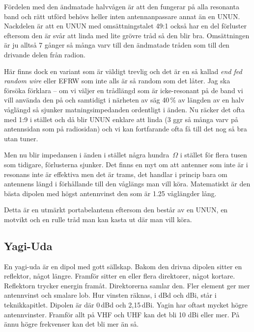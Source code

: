 Fördelen med den ändmatade halvvågen är att den fungerar på alla
resonanta band och rätt utförd behövs heller inten antennanpassare
annat än en UNUN. Nackdelen är att en UNUN med omsättningstalet 49:1
också har en del förluster eftersom den är svår att linda med lite
grövre tråd så den blir bra. Omsättningen är ju alltså 7 gånger så
många varv till den ändmatade tråden som till den drivande delen från
radion.

Här finns dock en variant som är väldigt trevlig och det är en så
kallad {\it end fed random wire} eller EFRW som inte alls är så random
som det låter. Jag ska försöka förklara -- om vi väljer en trådlängd
som är icke-resonant på de band vi vill använda den på och samtidigt i
närheten av säg 40\,\% av längden av en halv våglängd så sjunker
matningsimpedanden ordentligt i änden. Nu räcker det ofta med 1:9 i
stället och då blir UNUN enklare att linda (3 ggr så många varv på
antennsidan som på radiosidan) och vi kan fortfarande ofta få till det
nog så bra utan tuner.

Men nu blir impedansen i änden i stället några hundra~$\Omega$ i stället
för flera tusen som tidigare, förlusterna sjunker. Det finns en myt om
att antenner som inte är i resonans inte är effektiva men det är
trams, det handlar i princip bara om antennens längd i förhållande
till den våglängs man vill köra. Matematiskt är den bästa dipolen med
högst antennvinst den som är 1.25 våglängder lång.

Detta är en utmärkt portabelantenn eftersom den består av en UNUN, en
motvikt och en rulle tråd man kan kasta ut där man vill köra.

\subsection{Yagi-Uda}

En yagi-uda är en dipol med gott sällskap. Bakom den drivna dipolen
sitter en reflektor, något längre. Framför sitter en eller flera
direktorer, något kortare. Reflektorn trycker energin
framåt. Direktorerna samlar den.  Fler element ger mer antennvinst och
smalare lob. Hur vinsten räknas, i dBd och dBi, står i
teknikkapitlet. Dipolen är där 0\,dBd och 2,15\,dBi. Yagin har oftast
mycket högre antennvinster. Framför allt på VHF och UHF kan det bli 10
dBi eller mer. På ännu högre frekvenser kan det bli mer än så.

